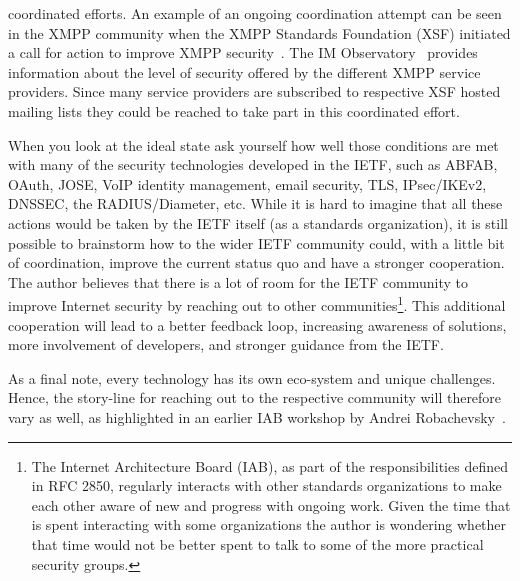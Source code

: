 \documentclass[peerreview, a4paper, 7pt]{IEEEtran}
\begin{document}
coordinated efforts. An example of an ongoing coordination attempt can be seen in the XMPP community when the XMPP Standards Foundation (XSF) initiated a call for action to improve XMPP security~\cite{manifesto}. The IM Observatory~\cite{IM-Observatory} provides information about the level of security offered by the different XMPP service providers. Since many service providers are subscribed to respective XSF hosted mailing lists they could be reached to take part in this coordinated effort. 

When you look at the ideal state ask yourself how well those conditions are met with many of the security technologies developed in the IETF, such as ABFAB, OAuth, JOSE, VoIP identity management, email security, TLS, IPsec/IKEv2, DNSSEC, the RADIUS/Diameter, etc. While it is hard to imagine that all these actions would be taken by the IETF itself (as a standards organization), it is still possible to brainstorm how to the wider IETF community could, with a little bit of coordination, improve the current status quo and have a stronger cooperation. The author believes that there is a lot of room for the IETF community to improve Internet security by reaching out to other communities\footnote{The Internet Architecture Board (IAB), as part of the responsibilities defined in RFC 2850, regularly interacts with other standards organizations to make each other aware of new and progress with ongoing work. Given the time that is spent interacting with some organizations the author is wondering whether that time would not be better spent to talk to some of the more practical security groups.}. This additional cooperation will lead to a better feedback loop, increasing awareness of solutions, more involvement of developers, and stronger guidance from the IETF. 

As a final note, every technology has its own eco-system and unique challenges. Hence, the story-line for reaching out to the respective community will therefore vary as well, as highlighted in an earlier IAB workshop by Andrei Robachevsky~\cite{Robachevsky}. 
%

% 

\end{document}
